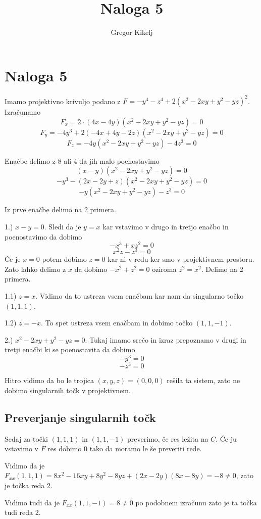 \documentclass[12pt]{article}
\title{Naloga 5}
\author{Gregor Kikelj}
\begin{document}
\section{Naloga 5}
Imamo projektivno krivuljo podano z $F=- y^{4} - z^{4} + 2 \left(x^{2} - 2 x y + y^{2} - y z\right)^{2}$. Izračunamo 
\[F_x = 2 \cdot \left(4 x - 4 y\right) \left(x^{2} - 2 x y + y^{2} - y z\right)=0\]
\[F_y = - 4 y^{3} + 2 \left(- 4 x + 4 y - 2 z\right) \left(x^{2} - 2 x y + y^{2} - y z\right)=0\]
\[F_z = - 4 y \left(x^{2} - 2 x y + y^{2} - y z\right) - 4 z^{3}=0\]
\bigskip

Enačbe delimo z 8 ali 4 da jih malo poenostavimo
\[{\left(x - y\right) \left(x^{2} - 2 x y + y^{2} - y z\right)}=0\]
\[- y^{3} - \left(2 x - 2 y + z\right) \left(x^{2} - 2 x y + y^{2} - y z\right)=0\]
\[- y \left(x^{2} - 2 x y + y^{2} - y z\right) - z^{3}=0\]
\bigskip

Iz prve enačbe delimo na 2 primera.
\bigskip

1.) $x-y=0$.
Sledi da je $y=x$ kar vstavimo v drugo in tretjo enačbo in poenostavimo da dobimo
\[- x^{3} + x z^{2}=0\]
\[x^{2} z - z^{3}=0\]
Če je $x=0$ potem dobimo $z=0$ kar ni v redu ker smo v projektivnem prostoru. Zato lahko delimo z $x$ da dobimo $-x^2+z^2=0$ oziroma $z^2=x^2$.
Delimo na 2 primera.
\bigskip

1.1) $z=x$.
Vidimo da to ustreza vsem enačbam kar nam da singularno točko $(1, 1, 1)$. 
\bigskip

1.2) $z=-x$.
To spet ustreza vsem enačbam in dobimo točko $(1, 1, -1)$.
\bigskip

2.) $x^{2} - 2 x y + y^{2} - y z=0$.
Tukaj imamo srečo in izraz prepoznamo v drugi in tretji enačbi ki se poenostavita da dobimo
\[-y^3=0\]
\[-z^3=0\]

Hitro vidimo da bo le trojica $(x, y, z)=(0, 0, 0)$ rešila ta sistem, zato ne dobimo singularnih točk v projektivnem.

\subsection{Preverjanje singularnih točk}
Sedaj za točki $(1, 1, 1)$ in $(1, 1, -1)$ preverimo, če res ležita na $C$. Če ju vstavimo v $F$ res dobimo $0$ tako da moramo le še preveriti rede.

Vidimo da je $F_{xx}(1,1,1)=8 x^{2} - 16 x y + 8 y^{2} - 8 y z + \left(2 x - 2 y\right) \left(8 x - 8 y\right)=-8\ne 0$, zato je točka reda 2.

Vidimo tudi da je $F_{xx}(1,1,-1)=8\ne 0$ po podobnem izračunu zato je ta točka tudi reda 2.

\end{document}
